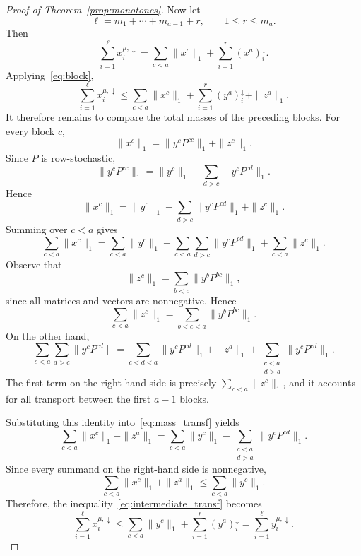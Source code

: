 \documentclass[11pt,a4paper,longbibliography]{amsart}
\numberwithin{equation}{section}
\theoremstyle{plain}
\theoremstyle{definition}
\theoremstyle{remark}
\begin{document}
\begin{proof}[Proof of Theorem~\ref{prop:monotones}]
				Now let
				$$
				\ell
				=
				m_1+\cdots+m_{a-1}+r,
				\qquad
				1\le r\le m_a.
				$$
				Then
				$$
				\sum_{i=1}^{\ell}x_i^{\mu,\downarrow}
				=
				\sum_{c<a}\|x^c\|_1
				+
				\sum_{i=1}^r(x^a)_i^\downarrow.
				$$
				Applying~\eqref{eq:block},
				\begin{equation}
					\label{eq:intermediate_transf}
					\sum_{i=1}^{\ell}x_i^{\mu,\downarrow}
					\le
					\sum_{c<a}\|x^c\|_1
					+
					\sum_{i=1}^r(y^a)_i^\downarrow
					+
					\|z^a\|_1. 
				\end{equation}
				It therefore remains to compare the total masses of the preceding blocks.
				For every block $c$,
				$$
				\|x^c\|_1
				=
				\|y^cP^{cc}\|_1+\|z^c\|_1.
				$$
				Since $P$ is row-stochastic,
				$$
				\|y^cP^{cc}\|_1
				=
				\|y^c\|_1
				-
				\sum_{d>c}\|y^cP^{cd}\|_1.
				$$
				Hence
				$$
				\|x^c\|_1
				=
				\|y^c\|_1
				-
				\sum_{d>c}\|y^cP^{cd}\|_1
				+
				\|z^c\|_1.
				$$
				Summing over $c<a$ gives
				\begin{equation}
					\label{eq:mass_transf}
					\sum_{c<a}\|x^c\|_1
					=
					\sum_{c<a}\|y^c\|_1
					-
					\sum_{c<a}\sum_{d>c}\|y^cP^{cd}\|_1
					+
					\sum_{c<a}\|z^c\|_1. 
				\end{equation}
				Observe that
				$$
				\|z^c\|_1
				=
				\sum_{b<c}\|y^bP^{bc}\|_1,
				$$
				since all matrices and vectors are nonnegative.
				Hence
				$$
				\sum_{c<a}\|z^c\|_1
				=
				\sum_{b<c<a}\|y^bP^{bc}\|_1.
				$$
				On the other hand,
				$$
				\sum_{c<a}\sum_{d>c}\|y^cP^{cd}\|
				=
				\sum_{c<d<a}\|y^cP^{cd}\|_1
				+
				\|z^a\|_1
				+
				\sum_{\substack{c<a\\ d>a}}\|y^cP^{cd}\|_1.
				$$
				The first term on the right-hand side is precisely
				$\sum_{c<a}\|z^c\|_1$, and it accounts for all transport
				between the first $a-1$ blocks.
				
				
				Substituting this identity into~\eqref{eq:mass_transf} yields
				$$
				\sum_{c<a}\|x^c\|_1
				+\|z^a\|_1
				=
				\sum_{c<a}\|y^c\|_1
				-
				\sum_{\substack{c<a\\ d>a}}
				\|y^cP^{cd}\|_1.
				$$
				Since every summand on the right-hand side is nonnegative,
				$$
				\sum_{c<a}\|x^c\|_1
				+\|z^a\|_1
				\le
				\sum_{c<a}\|y^c\|_1.
				$$
				Therefore, the inequality~\eqref{eq:intermediate_transf} becomes
				$$
				\sum_{i=1}^{\ell}x_i^{\mu,\downarrow}
				\le
				\sum_{c<a}\|y^c\|_1
				+
				\sum_{i=1}^r(y^a)_i^\downarrow
				=
				\sum_{i=1}^{\ell}y_i^{\mu,\downarrow}.
				$$
				

\end{proof}
\end{document}
